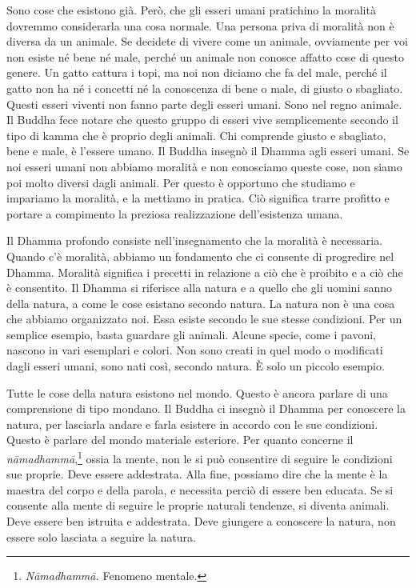 Sono cose che esistono già. Però, che gli esseri umani pratichino la
moralità dovremmo considerarla una cosa normale. Una persona priva di
moralità non è diversa da un animale. Se decidete di vivere come un
animale, ovviamente per voi non esiste né bene né male, perché un
animale non conosce affatto cose di questo genere. Un gatto cattura i
topi, ma noi non diciamo che fa del male, perché il gatto non ha né i
concetti né la conoscenza di bene o male, di giusto o sbagliato. Questi
esseri viventi non fanno parte degli esseri umani. Sono nel regno
animale. Il Buddha fece notare che questo gruppo di esseri vive
semplicemente secondo il tipo di kamma che è proprio degli
animali. Chi comprende giusto e sbagliato, bene e male, è l'essere
umano. Il Buddha insegnò il Dhamma agli esseri umani. Se noi esseri
umani non abbiamo moralità e non conosciamo queste cose, non siamo poi
molto diversi dagli animali. Per questo è opportuno che studiamo e
impariamo la moralità, e la mettiamo in pratica. Ciò significa trarre
profitto e portare a compimento la preziosa realizzazione dell'esistenza
umana.

Il Dhamma profondo consiste nell'insegnamento che la moralità è
necessaria. Quando c'è moralità, abbiamo un fondamento che ci consente
di progredire nel Dhamma. Moralità significa i precetti in relazione a
ciò che è proibito e a ciò che è consentito. Il Dhamma si riferisce alla
natura e a quello che gli uomini sanno della natura, a come le cose
esistano secondo natura. La natura non è una cosa che abbiamo
organizzato noi. Essa esiste secondo le sue stesse condizioni. Per un
semplice esempio, basta guardare gli animali. Alcune specie, come i
pavoni, nascono in vari esemplari e colori. Non sono creati in quel modo
o modificati dagli esseri umani, sono nati così, secondo natura. È solo
un piccolo esempio.

Tutte le cose della natura esistono nel mondo. Questo è ancora parlare
di una comprensione di tipo mondano. Il Buddha ci insegnò il Dhamma per
conoscere la natura, per lasciarla andare e farla esistere in accordo
con le sue condizioni. Questo è parlare del mondo materiale esteriore.
Per quanto concerne il \emph{nāmadhammā},\footnote{\emph{Nāmadhammā.}
  Fenomeno mentale.} ossia la mente, non le si può consentire di seguire
le condizioni sue proprie. Deve essere addestrata. Alla fine, possiamo
dire che la mente è la maestra del corpo e della parola, e necessita
perciò di essere ben educata. Se si consente alla mente di seguire le
proprie naturali tendenze, si diventa animali. Deve essere ben istruita
e addestrata. Deve giungere a conoscere la natura, non essere solo
lasciata a seguire la natura.

